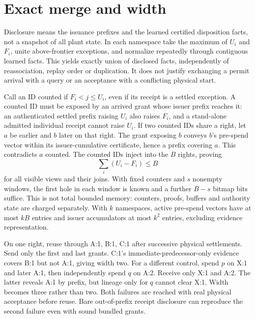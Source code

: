 \documentclass[11pt]{article}
\begin{document}
\section{Exact merge and width}
Disclosure means the issuance prefixes and the learned certified disposition facts, not a snapshot of all plant state. In each namespace take the maximum of $U_i$ and $F_i$, unite above-frontier exceptions, and normalize repeatedly through contiguous learned facts. This yields exactly union of disclosed facts, independently of reassociation, replay order or duplication. It does not justify exchanging a permit arrival with a query or an acceptance with a conflicting physical start.

Call an ID counted if $F_i<j\le U_i$, even if its receipt is a settled exception. A counted ID must be exposed by an arrived grant whose issuer prefix reaches it: an authenticated settled prefix raising $U_i$ also raises $F_i$, and a stand-alone admitted individual receipt cannot raise $U_i$. If two counted IDs share a right, let $a$ be earlier and $b$ later on that right. The grant exposing $b$ conveys $b$'s pre-spend vector within its issuer-cumulative certificate, hence a prefix covering $a$. This contradicts $a$ counted. The counted IDs inject into the $B$ rights, proving
\[
                            \sum_i(U_i-F_i)\le B
\]
for all visible views and their joins. With fixed counters and $s$ nonempty windows, the first hole in each window is known and a further $B-s$ bitmap bits suffice. This is not total bounded memory: counters, proofs, buffers and authority state are charged separately. With $k$ namespaces, active pre-spend vectors have at most $kB$ entries and issuer accumulators at most $k^2$ entries, excluding evidence representation.

On one right, reuse through A:1, B:1, C:1 after successive physical settlements. Send only the first and last grants. C:1's immediate-predecessor-only evidence covers B:1 but not A:1, giving width two. For a different control, spend $p$ on X:1 and later A:1, then independently spend $q$ on A:2. Receive only X:1 and A:2. The latter reveals A:1 by prefix, but lineage only for $q$ cannot clear X:1. Width becomes three rather than two. Both failures are reached with real physical acceptance before reuse. Bare out-of-prefix receipt disclosure can reproduce the second failure even with sound bundled grants.
\end{document}
